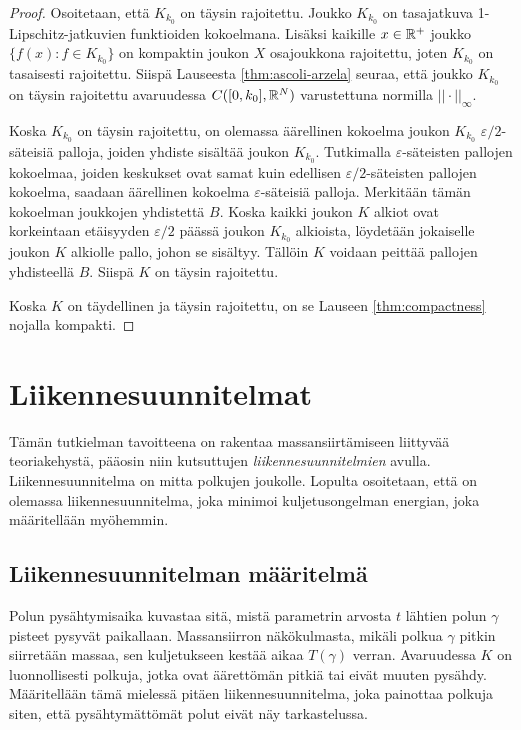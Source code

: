 \documentclass[12pt,oneside,a4paper]{amsbook} %
\begin{document}
\begin{proof}
    Osoitetaan, että $K_{k_0}$ on täysin rajoitettu. Joukko $K_{k_0}$ on tasajatkuva 1-Lipschitz-jatkuvien funktioiden kokoelmana. Lisäksi kaikille $x\in {\mathbb{R}^{+}}$ joukko $\{f(x) : f \in K_{k_0}\}$ on kompaktin joukon $X$ osajoukkona rajoitettu, joten $K_{k_0}$ on tasaisesti rajoitettu. Siispä Lauseesta \ref{thm:ascoli-arzela} seuraa, että joukko $K_{k_0}$ on täysin rajoitettu avaruudessa $C([0, k_0], \mathbb{R}^N)$ varustettuna normilla $||\cdot ||_\infty$.
    
    Koska $K_{k_0}$ on täysin rajoitettu, on olemassa äärellinen kokoelma joukon $K_{k_0}$ $\varepsilon/2$-säteisiä palloja, joiden yhdiste sisältää joukon $K_{k_0}$. Tutkimalla $\varepsilon$-säteisten pallojen kokoelmaa, joiden keskukset ovat samat kuin edellisen $\varepsilon/2$-säteisten pallojen kokoelma, saadaan äärellinen kokoelma $\varepsilon$-säteisiä palloja. Merkitään tämän kokoelman joukkojen yhdistettä $B$. Koska kaikki joukon $K$ alkiot ovat korkeintaan etäisyyden $\varepsilon/2$ päässä joukon $K_{k_0}$ alkioista, löydetään jokaiselle joukon $K$ alkiolle pallo, johon se sisältyy. Tällöin $K$ voidaan peittää pallojen yhdisteellä $B$. Siispä $K$ on täysin rajoitettu.
    
    Koska $K$ on täydellinen ja täysin rajoitettu, on se Lauseen \ref{thm:compactness} nojalla kompakti.
    \end{proof}



\chapter{Liikennesuunnitelmat}

Tämän tutkielman tavoitteena on rakentaa massansiirtämiseen liittyvää teoriakehystä, pääosin niin kutsuttujen \textit{liikennesuunnitelmien} avulla. Liikennesuunnitelma on mitta polkujen joukolle. Lopulta osoitetaan, että on olemassa liikennesuunnitelma, joka minimoi kuljetusongelman energian, joka määritellään myöhemmin. 

\section{Liikennesuunnitelman määritelmä}

Polun pysähtymisaika kuvastaa sitä, mistä parametrin arvosta $t$ lähtien polun $\gamma$ pisteet pysyvät paikallaan. Massansiirron näkökulmasta, mikäli polkua $\gamma$ pitkin siirretään massaa, sen kuljetukseen kestää aikaa $T(\gamma)$ verran. Avaruudessa $K$ on luonnollisesti polkuja, jotka ovat äärettömän pitkiä tai eivät muuten pysähdy. Määritellään tämä mielessä pitäen liikennesuunnitelma, joka painottaa polkuja siten, että pysähtymättömät polut eivät näy tarkastelussa.
\end{document}
